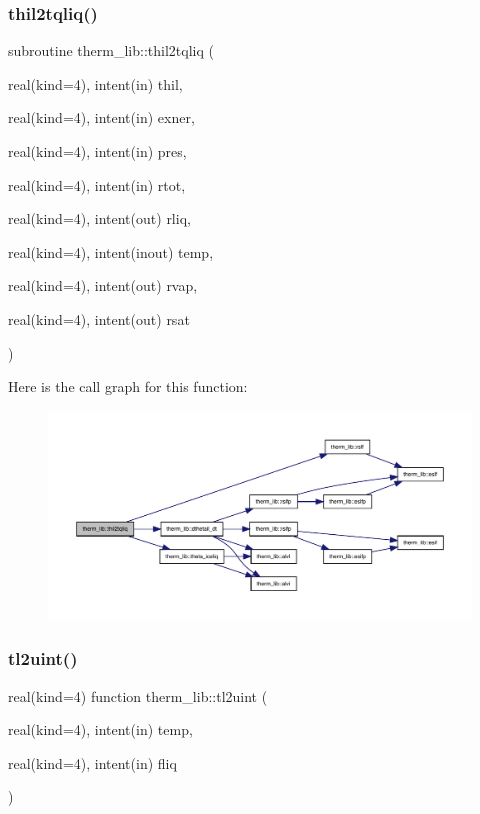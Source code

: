 \subsubsection{\texorpdfstring{thil2tqliq()}{thil2tqliq()}}
{\footnotesize\ttfamily subroutine therm\+\_\+lib\+::thil2tqliq (\begin{DoxyParamCaption}\item[{real(kind=4), intent(in)}]{thil,  }\item[{real(kind=4), intent(in)}]{exner,  }\item[{real(kind=4), intent(in)}]{pres,  }\item[{real(kind=4), intent(in)}]{rtot,  }\item[{real(kind=4), intent(out)}]{rliq,  }\item[{real(kind=4), intent(inout)}]{temp,  }\item[{real(kind=4), intent(out)}]{rvap,  }\item[{real(kind=4), intent(out)}]{rsat }\end{DoxyParamCaption})}

Here is the call graph for this function\+:
\nopagebreak
\begin{figure}[H]
\begin{center}
\leavevmode
\includegraphics[width=350pt]{namespacetherm__lib_a0285be7469fbc289302f23bd321fce36_cgraph}
\end{center}
\end{figure}
\mbox{\label{namespacetherm__lib_a3ad59a4037ed8ed57532b8ea630a7df1}} 
\subsubsection{\texorpdfstring{tl2uint()}{tl2uint()}}
{\footnotesize\ttfamily real(kind=4) function therm\+\_\+lib\+::tl2uint (\begin{DoxyParamCaption}\item[{real(kind=4), intent(in)}]{temp,  }\item[{real(kind=4), intent(in)}]{fliq }\end{DoxyParamCaption})}

